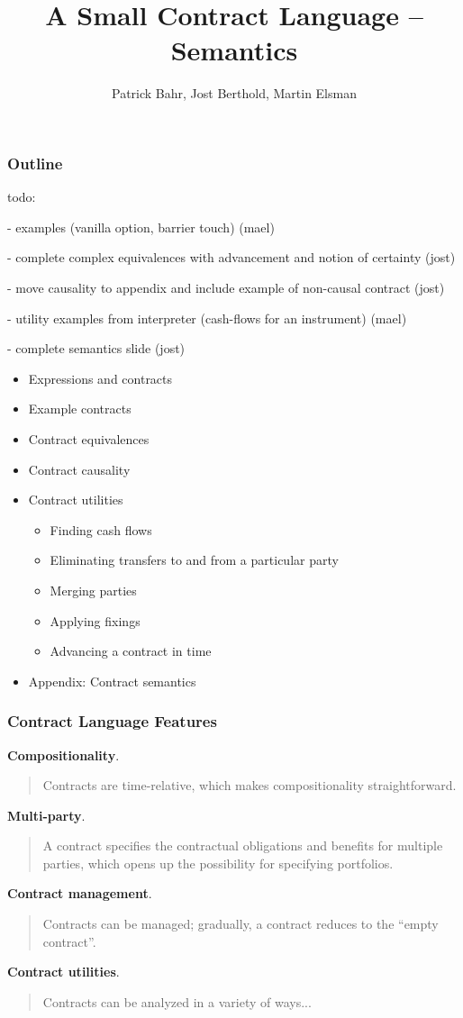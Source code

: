 \documentclass[xcolor=dvipsnames,11pt]{beamer}
\title{A Small Contract Language -- Semantics}
\author[Bahr,Berthold,Elsman]{Patrick Bahr, Jost Berthold, Martin Elsman}
\begin{document}
\frame[plain]{\titlepage}

\begin{frame}[fragile,t]
    \frametitle{Outline}

todo:

 - examples (vanilla option, barrier touch)                                     (mael)

 - complete complex equivalences with advancement and notion of certainty       (jost)

 - move causality to appendix and include example of non-causal contract        (jost)

 - utility examples from interpreter (cash-flows for an instrument)             (mael)

 - complete semantics slide                                                     (jost)

\begin{itemize}
\item Expressions and contracts
\item Example contracts
\item Contract equivalences
\item Contract causality
\item Contract utilities
 \begin{itemize}
  \item Finding cash flows
  \item Eliminating transfers to and from a particular party
  \item Merging parties
  \item Applying fixings
  \item Advancing a contract in time
  \end{itemize}
\item Appendix: Contract semantics
\end{itemize}
\end{frame}

\begin{frame}[fragile,t]
    \frametitle{Contract Language Features}

\textbf{Compositionality}. 
\begin{quote}
Contracts are time-relative, which makes compositionality
straightforward.
\end{quote}

\textbf{Multi-party}.
\begin{quote}
A contract specifies the contractual obligations and benefits for
multiple parties, which opens up the possibility for specifying
portfolios.
\end{quote}

\textbf{Contract management}.
\begin{quote}
Contracts can be managed; gradually, a contract reduces to the ``empty
contract''.
\end{quote}

\textbf{Contract utilities}.
\begin{quote}
Contracts can be analyzed in a variety of ways...
\end{quote}

\end{frame} 
\end{document}
